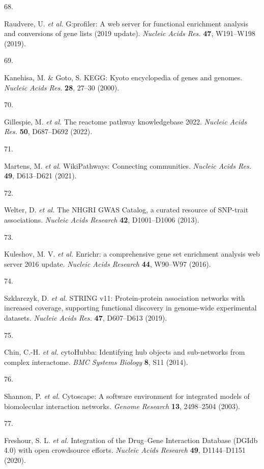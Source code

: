 \documentclass[
  11,
  a4paper,
]{article}
\newlength{\cslhangindent}
\newlength{\csllabelwidth}
\newlength{\cslentryspacingunit} %
\newenvironment{CSLReferences}[2] %
 {%
  \setlength{\parindent}{0pt}
  \ifodd #1
  \let\oldpar\par
  \def\par{\hangindent=\cslhangindent\oldpar}
  \fi
  \setlength{\parskip}{#2\cslentryspacingunit}
 }%
 {}
\newcommand{\CSLLeftMargin}[1]{\parbox[t]{\csllabelwidth}{#1}}
\newcommand{\CSLRightInline}[1]{\parbox[t]{\linewidth - \csllabelwidth}{#1}\break}
\begin{document}
\begin{CSLReferences}{0}{0}
\leavevmode{}%
\CSLLeftMargin{68. }%
\CSLRightInline{Raudvere, U. \emph{et al.} G:profiler: A web server for
functional enrichment analysis and conversions of gene lists (2019
update). \emph{Nucleic Acids Res.} \textbf{47}, W191--W198 (2019).}

\leavevmode{}%
\CSLLeftMargin{69. }%
\CSLRightInline{Kanehisa, M. \& Goto, S. {KEGG}: Kyoto encyclopedia of
genes and genomes. \emph{Nucleic Acids Res.} \textbf{28}, 27--30
(2000).}

\leavevmode{}%
\CSLLeftMargin{70. }%
\CSLRightInline{Gillespie, M. \emph{et al.} The reactome pathway
knowledgebase 2022. \emph{Nucleic Acids Res.} \textbf{50}, D687--D692
(2022).}

\leavevmode{}%
\CSLLeftMargin{71. }%
\CSLRightInline{Martens, M. \emph{et al.} {WikiPathways}: Connecting
communities. \emph{Nucleic Acids Res.} \textbf{49}, D613--D621 (2021).}

\leavevmode{}%
\CSLLeftMargin{72. }%
\CSLRightInline{Welter, D. \emph{et al.} {The NHGRI GWAS Catalog, a
curated resource of SNP-trait associations}. \emph{Nucleic Acids
Research} \textbf{42}, D1001--D1006 (2013).}

\leavevmode{}%
\CSLLeftMargin{73. }%
\CSLRightInline{Kuleshov, M. V. \emph{et al.} {Enrichr: a comprehensive
gene set enrichment analysis web server 2016 update}. \emph{Nucleic
Acids Research} \textbf{44}, W90--W97 (2016).}

\leavevmode{}%
\CSLLeftMargin{74. }%
\CSLRightInline{Szklarczyk, D. \emph{et al.} {STRING} v11:
Protein-protein association networks with increased coverage, supporting
functional discovery in genome-wide experimental datasets. \emph{Nucleic
Acids Res.} \textbf{47}, D607--D613 (2019).}

\leavevmode{}%
\CSLLeftMargin{75. }%
\CSLRightInline{Chin, C.-H. \emph{et al.} {cytoHubba}: Identifying hub
objects and sub-networks from complex interactome. \emph{BMC Systems
Biology} \textbf{8}, S11 (2014).}

\leavevmode{}%
\CSLLeftMargin{76. }%
\CSLRightInline{Shannon, P. \emph{et al.} Cytoscape: A software
environment for integrated models of biomolecular interaction networks.
\emph{Genome Research} \textbf{13}, 2498--2504 (2003).}

\leavevmode{}%
\CSLLeftMargin{77. }%
\CSLRightInline{Freshour, S. L. \emph{et al.} {Integration of the
Drug--Gene Interaction Database (DGIdb 4.0) with open crowdsource
efforts}. \emph{Nucleic Acids Research} \textbf{49}, D1144--D1151
(2020).}

\end{CSLReferences}
\end{document}
